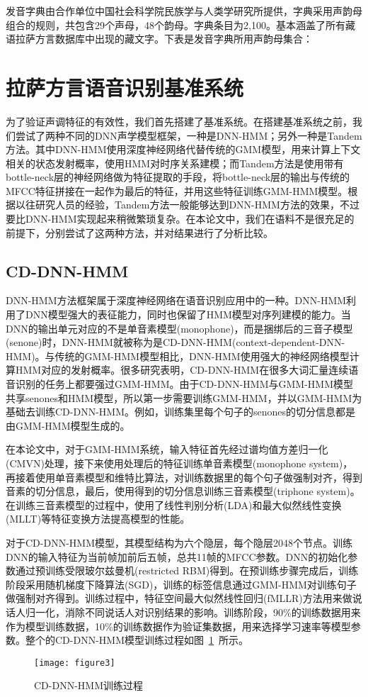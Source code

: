发音字典由合作单位中国社会科学院民族学与人类学研究所提供，字典采用声韵母组合的规则，共包含29个声母，48个韵母。字典条目为2,100。基本涵盖了所有藏语拉萨方言数据库中出现的藏文字。下表是发音字典所用声韵母集合：{\color{red}{添加拉萨声韵母集合}}
\section{拉萨方言语音识别基准系统}
为了验证声调特征的有效性，我们首先搭建了基准系统。在搭建基准系统之前，我们尝试了两种不同的DNN声学模型框架，一种是DNN-HMM；另外一种是Tandem方法。其中DNN-HMM使用深度神经网络代替传统的GMM模型，用来计算上下文相关的状态发射概率，使用HMM对时序关系建模；而Tandem方法是使用带有bottle-neck层的神经网络做为特征提取的手段，将bottle-neck层的输出与传统的MFCC特征拼接在一起作为最后的特征，并用这些特征训练GMM-HMM模型。根据以往研究人员的经验，Tandem方法一般能够达到DNN-HMM方法的效果，不过要比DNN-HMM实现起来稍微繁琐复杂。在本论文中，我们在语料不是很充足的前提下，分别尝试了这两种方法，并对结果进行了分析比较。
\subsection{CD-DNN-HMM}
DNN-HMM方法框架属于深度神经网络在语音识别应用中的一种。DNN-HMM利用了DNN模型强大的表征能力，同时也保留了HMM模型对序列建模的能力。当DNN的输出单元对应的不是单音素模型(monophone)，而是捆绑后的三音子模型(senone)时，DNN-HMM就被称为是CD-DNN-HMM(context-dependent-DNN-HMM)。与传统的GMM-HMM模型相比，DNN-HMM使用强大的神经网络模型计算HMM对应的发射概率。很多研究表明，CD-DNN-HMM在很多大词汇量连续语音识别的任务上都要强过GMM-HMM。由于CD-DNN-HMM与GMM-HMM模型共享senones和HMM模型，所以第一步需要训练GMM-HMM，并以GMM-HMM为基础去训练CD-DNN-HMM。例如，训练集里每个句子的senones的切分信息都是由GMM-HMM模型生成的。

在本论文中，对于GMM-HMM系统，输入特征首先经过谱均值方差归一化(CMVN)处理，接下来使用处理后的特征训练单音素模型(monophone system)，再接着使用单音素模型和维特比算法，对训练数据里的每个句子做强制对齐，得到音素的切分信息，最后，使用得到的切分信息训练三音素模型(triphone system)。在训练三音素模型的过程中，使用了线性判别分析(LDA)和最大似然线性变换(MLLT)等特征变换方法提高模型的性能。

对于CD-DNN-HMM模型，其模型结构为六个隐层，每个隐层2048个节点。训练DNN的输入特征为当前帧加前后五帧，总共11帧的MFCC参数。DNN的初始化参数通过预训练受限玻尔兹曼机(restricted RBM)得到。在预训练步骤完成后，训练阶段采用随机梯度下降算法(SGD)，训练的标签信息通过GMM-HMM对训练句子做强制对齐得到。训练过程中，特征空间最大似然线性回归(fMLLR)方法用来做说话人归一化，消除不同说话人对识别结果的影响。训练阶段，90\%的训练数据用来作为模型训练数据，10\%的训练数据作为验证集数据，用来选择学习速率等模型参数。整个的CD-DNN-HMM模型训练过程如图~\ref{fig:figure3}~所示。
\begin{figure}[htbp]
\centering
\texttt{[image: figure3]}
\caption{CD-DNN-HMM训练过程}\label{fig:figure3}
\vspace{\baselineskip}
\end{figure}

